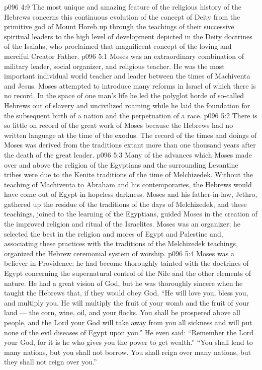 \vs p096 4:9 The most unique and amazing feature of the religious history of the Hebrews concerns this continuous evolution of the concept of Deity from the primitive god of Mount Horeb up through the teachings of their successive spiritual leaders to the high level of development depicted in the Deity doctrines of the Isaiahs, who proclaimed that magnificent concept of the loving and merciful Creator Father.
\vs p096 5:1 Moses was an extraordinary combination of military leader, social organizer, and religious teacher. He was the most important individual world teacher and leader between the times of Machiventa and Jesus. Moses attempted to introduce many reforms in Israel of which there is no record. In the space of one man’s life he led the polyglot horde of so\hyp{}called Hebrews out of slavery and uncivilized roaming while he laid the foundation for the subsequent birth of a nation and the perpetuation of a race.
\vs p096 5:2 There is so little on record of the great work of Moses because the Hebrews had no written language at the time of the exodus. The record of the times and doings of Moses was derived from the traditions extant more than one thousand years after the death of the great leader.
\vs p096 5:3 Many of the advances which Moses made over and above the religion of the Egyptians and the surrounding Levantine tribes were due to the Kenite traditions of the time of Melchizedek. Without the teaching of Machiventa to Abraham and his contemporaries, the Hebrews would have come out of Egypt in hopeless darkness. Moses and his father\hyp{}in\hyp{}law, Jethro, gathered up the residue of the traditions of the days of Melchizedek, and these teachings, joined to the learning of the Egyptians, guided Moses in the creation of the improved religion and ritual of the Israelites. Moses was an organizer; he selected the best in the religion and mores of Egypt and Palestine and, associating these practices with the traditions of the Melchizedek teachings, organized the Hebrew ceremonial system of worship.
\vs p096 5:4 \pc Moses was a believer in Providence; he had become thoroughly tainted with the doctrines of Egypt concerning the supernatural control of the Nile and the other elements of nature. He had a great vision of God, but he was thoroughly sincere when he taught the Hebrews that, if they would obey God, “He will love you, bless you, and multiply you. He will multiply the fruit of your womb and the fruit of your land --- the corn, wine, oil, and your flocks. You shall be prospered above all people, and the Lord your God will take away from you all sickness and will put none of the evil diseases of Egypt upon you.” He even said: “Remember the Lord your God, for it is he who gives you the power to get wealth.” “You shall lend to many nations, but you shall not borrow. You shall reign over many nations, but they shall not reign over you.”
